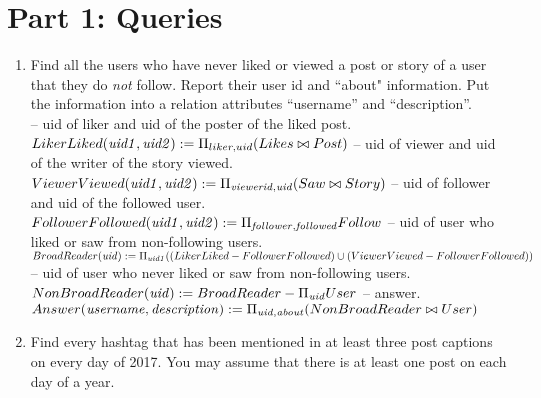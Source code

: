 \documentclass{article}
\newcommand{\var}[1]{\mathit{#1}}
\begin{document}
\section*{Part 1: Queries}

\begin{enumerate}

\item   %
Find all the users who have never liked or viewed a post or story 
of a user that they do {\it not} follow. 
Report their user id and ``about" information. 
Put the information into a relation  attributes ``username'' and ``description''. \\

{\large %
-- uid of liker and uid of the poster of the liked post. \\[5pt]
$
LikerLiked(\var{uid1, uid2}) := 
	\Pi_{liker, uid} 
	(Likes
	\bowtie 
	Post) \\[10pt]
$
-- uid of viewer and uid of the writer of the story viewed. \\[5pt]
$
ViewerViewed(\var{uid1, uid2}) := 
	\Pi_{\var{viewerid, uid}} 
	(Saw
	\bowtie
	Story)
	\\[10pt]
$
-- uid of follower and uid of the followed user. \\[5pt]
$
FollowerFollowed(\var{uid1, uid2}) := 
	\Pi_{\var{follower, followed}} 
	Follow
	\\[10pt]
$
-- uid of user who liked or saw from non-following users. \\[5pt]
$
BroadReader(\var{uid}) := 
	\Pi_{\var{uid1}} (
	(LikerLiked - FollowerFollowed)
	\cup \\
	(ViewerViewed- FollowerFollowed))
	\\[10pt]
$
-- uid of user who never liked or saw from non-following users. \\[5pt]
$
NonBroadReader(\var{uid}) := 
	BroadReader - \Pi_{\var{uid}}User
	\\[10pt]
$
-- answer. \\[5pt]
$
Answer(\var{username, description}) := 
	\Pi_{\var{uid, about}}
	(NonBroadReader
	\bowtie
	User) 
	\\[10pt]
$
} %


\item   %
Find every hashtag that has been mentioned in at least three post captions
on every day of 2017.
You may assume that there is at least one post on each day of a year. 


\end{enumerate}
\end{document}

